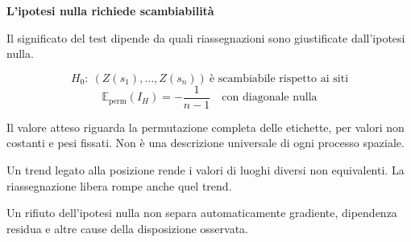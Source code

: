 \documentclass[12pt,aspectratio=1610]{beamer}
\newcommand{\PBody}[1]{\par{\fontsize{11.3}{14.8}\selectfont #1\par}}
\newcommand{\PSmall}[1]{\par{\fontsize{9.8}{13.1}\selectfont #1\par}}
\newcommand{\PInfo}[1]{%
\begin{tcolorbox}[enhanced,arc=1.6mm,boxrule=.55pt,colback=GeoTint,
 colframe=Rule!80!Classical,left=2.3mm,right=2.3mm,top=2mm,bottom=2mm,
 before skip=1mm,after skip=1mm]
\PSmall{#1}\end{tcolorbox}}
\begin{document}
\begin{frame}[plain]\hypertarget{slide64}{}
\begin{lrbox}{\TitleBox}
\begin{minipage}[t]{17.7cm}\raggedright\color{Ink}\fontsize{11.3}{14.8}\selectfont
\color{Navy}\bfseries\fontsize{20.6}{24.5}\selectfont L’ipotesi nulla richiede scambiabilità
\end{minipage}\end{lrbox}

\begin{lrbox}{\RecallBox}
\begin{minipage}[t]{14.3cm}\raggedright\color{Ink}\fontsize{11.3}{14.8}\selectfont
\fontsize{10.3}{13.8}\selectfont Il significato del test dipende da quali riassegnazioni sono giustificate dall’ipotesi nulla.
\end{minipage}\end{lrbox}

\begin{lrbox}{\PilotLeftBox}
\begin{minipage}[t]{10.05cm}\raggedright\color{Ink}\fontsize{11.3}{14.8}\selectfont
\[H_0:\ (Z(s_1),\ldots,Z(s_n))\ \text{è scambiabile rispetto ai siti}\]
\[\mathbb E_{\mathrm{perm}}(I_H)=-\frac{1}{n-1}\quad\text{con diagonale nulla}\]
\PInfo{Il valore atteso riguarda la permutazione completa delle etichette, per valori non costanti e pesi fissati. Non è una descrizione universale di ogni processo spaziale.}

\end{minipage}\end{lrbox}

\begin{lrbox}{\PilotRightBox}
\begin{minipage}[t]{7.55cm}\raggedright\color{Ink}\fontsize{11.3}{14.8}\selectfont
\PBody{Un trend legato alla posizione rende i valori di luoghi diversi non equivalenti. La riassegnazione libera rompe anche quel trend.}
\vspace{2.5mm}
\PBody{Un rifiuto dell’ipotesi nulla non separa automaticamente gradiente, dipendenza residua e altre cause della disposizione osservata.}
\vspace{2.5mm}

\end{minipage}\end{lrbox}


\end{frame}
\end{document}
